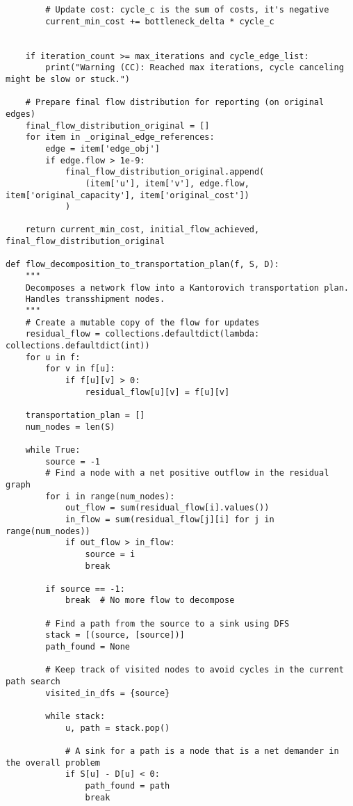 \begin{verbatim}
        # Update cost: cycle_c is the sum of costs, it's negative
        current_min_cost += bottleneck_delta * cycle_c


    if iteration_count >= max_iterations and cycle_edge_list:
        print("Warning (CC): Reached max iterations, cycle canceling might be slow or stuck.")

    # Prepare final flow distribution for reporting (on original edges)
    final_flow_distribution_original = []
    for item in _original_edge_references:
        edge = item['edge_obj']
        if edge.flow > 1e-9:
            final_flow_distribution_original.append(
                (item['u'], item['v'], edge.flow, item['original_capacity'], item['original_cost'])
            )
            
    return current_min_cost, initial_flow_achieved, final_flow_distribution_original

def flow_decomposition_to_transportation_plan(f, S, D):
    """
    Decomposes a network flow into a Kantorovich transportation plan.
    Handles transshipment nodes.
    """
    # Create a mutable copy of the flow for updates
    residual_flow = collections.defaultdict(lambda: collections.defaultdict(int))
    for u in f:
        for v in f[u]:
            if f[u][v] > 0:
                residual_flow[u][v] = f[u][v]

    transportation_plan = []
    num_nodes = len(S)

    while True:
        source = -1
        # Find a node with a net positive outflow in the residual graph
        for i in range(num_nodes):
            out_flow = sum(residual_flow[i].values())
            in_flow = sum(residual_flow[j][i] for j in range(num_nodes))
            if out_flow > in_flow:
                source = i
                break

        if source == -1:
            break  # No more flow to decompose

        # Find a path from the source to a sink using DFS
        stack = [(source, [source])]
        path_found = None
        
        # Keep track of visited nodes to avoid cycles in the current path search
        visited_in_dfs = {source}

        while stack:
            u, path = stack.pop()
            
            # A sink for a path is a node that is a net demander in the overall problem
            if S[u] - D[u] < 0:
                path_found = path
                break


\end{verbatim}
